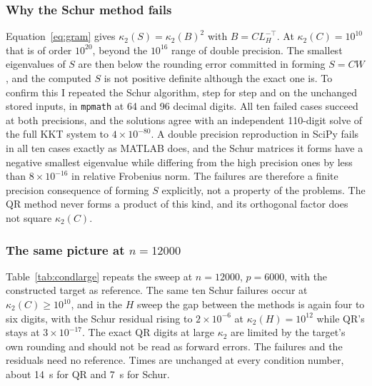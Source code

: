 \documentclass[10pt]{article}
\newcommand{\kap}{\kappa_2}
\begin{document}
\subsubsection*{Why the Schur method fails} Equation~\eqref{eq:gram} gives
$\kap(S)=\kap(B)^2$ with $B=CL_H^{-\top}$. At $\kap(C)=10^{10}$ that is of order $10^{20}$,
beyond the $10^{16}$ range of double precision. The smallest eigenvalues of $S$ are then
below the rounding error committed in forming $S=CW$, and the computed $S$ is not
positive definite although the exact one is. To confirm this I repeated the Schur
algorithm, step for step and on the unchanged stored inputs, in \texttt{mpmath} at 64 and
96 decimal digits. All ten failed cases succeed at both precisions, and the solutions
agree with an independent 110-digit solve of the full KKT system to $4\times10^{-80}$. A
double precision reproduction in SciPy fails in all ten cases exactly as MATLAB does, and
the Schur matrices it forms have a negative smallest eigenvalue while differing from the
high precision ones by less than $8\times10^{-16}$ in relative Frobenius norm. The
failures are therefore a finite precision consequence of forming $S$ explicitly, not a
property of the problems. The QR method never forms a product of this kind, and its
orthogonal factor does not square $\kap(C)$.

\subsubsection*{The same picture at $n=12000$} Table~\ref{tab:condlarge} repeats the sweep at
$n=12000$, $p=6000$, with the constructed target as reference. The same ten Schur
failures occur at $\kap(C)\ge10^{10}$, and in the $H$ sweep the gap between the methods is
again four to six digits, with the Schur residual rising to $2\times10^{-6}$ at
$\kap(H)=10^{12}$ while QR's stays at $3\times10^{-17}$. The exact QR digits at large
$\kap$ are limited by the target's own rounding and should not be read as forward
errors. The failures and the residuals need no reference. Times are unchanged at every
condition number, about 14~s for QR and 7~s for Schur.
\end{document}
